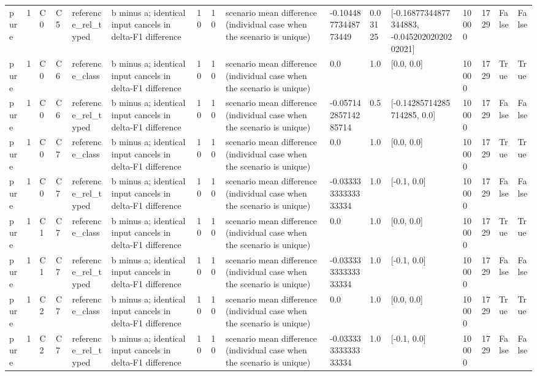 \begin{tabular}{llllllllllllllll}
pure & 1 & C0 & C5 & reference\_rel\_typed & b minus a; identical input cancels in delta-F1 difference & 10 & 10 & scenario mean difference (individual case when the scenario is unique) & -0.10448773448773449 & 0.03125 & [-0.16877344877344883, -0.04520202020202021] & 10000 & 1729 & False & False \\
pure & 1 & C0 & C6 & reference\_class & b minus a; identical input cancels in delta-F1 difference & 10 & 10 & scenario mean difference (individual case when the scenario is unique) & 0.0 & 1.0 & [0.0, 0.0] & 10000 & 1729 & True & True \\
pure & 1 & C0 & C6 & reference\_rel\_typed & b minus a; identical input cancels in delta-F1 difference & 10 & 10 & scenario mean difference (individual case when the scenario is unique) & -0.05714285714285714 & 0.5 & [-0.14285714285714285, 0.0] & 10000 & 1729 & False & False \\
pure & 1 & C0 & C7 & reference\_class & b minus a; identical input cancels in delta-F1 difference & 10 & 10 & scenario mean difference (individual case when the scenario is unique) & 0.0 & 1.0 & [0.0, 0.0] & 10000 & 1729 & True & True \\
pure & 1 & C0 & C7 & reference\_rel\_typed & b minus a; identical input cancels in delta-F1 difference & 10 & 10 & scenario mean difference (individual case when the scenario is unique) & -0.03333333333333334 & 1.0 & [-0.1, 0.0] & 10000 & 1729 & False & False \\
pure & 1 & C1 & C7 & reference\_class & b minus a; identical input cancels in delta-F1 difference & 10 & 10 & scenario mean difference (individual case when the scenario is unique) & 0.0 & 1.0 & [0.0, 0.0] & 10000 & 1729 & True & True \\
pure & 1 & C1 & C7 & reference\_rel\_typed & b minus a; identical input cancels in delta-F1 difference & 10 & 10 & scenario mean difference (individual case when the scenario is unique) & -0.03333333333333334 & 1.0 & [-0.1, 0.0] & 10000 & 1729 & False & False \\
pure & 1 & C2 & C7 & reference\_class & b minus a; identical input cancels in delta-F1 difference & 10 & 10 & scenario mean difference (individual case when the scenario is unique) & 0.0 & 1.0 & [0.0, 0.0] & 10000 & 1729 & True & True \\
pure & 1 & C2 & C7 & reference\_rel\_typed & b minus a; identical input cancels in delta-F1 difference & 10 & 10 & scenario mean difference (individual case when the scenario is unique) & -0.03333333333333334 & 1.0 & [-0.1, 0.0] & 10000 & 1729 & False & False \\

\end{tabular}
